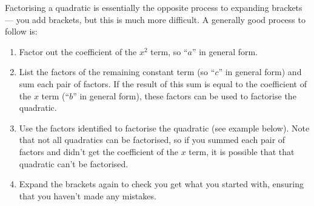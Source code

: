 \documentclass[12pt]{article}
\begin{document}
Factorising a quadratic is essentially the opposite process to expanding brackets --- you add brackets, but this is much more difficult. A generally good process to follow is: 
\begin{enumerate}
  \item Factor out the coefficient of the $x^2$ term, so ``$a$'' in general form.
  \item List the factors of the remaining constant term (so ``$c$'' in general form) and sum each pair of factors. If the result of this sum is equal to the coefficient of the $x$ term (``$b$'' in general form), these factors can be used to factorise the quadratic.
  \item Use the factors identified to factorise the quadratic (see example below). Note that not all quadratics can be factorised, so if you summed each pair of factors and didn't get the coefficient of the $x$ term, it is possible that that quadratic can't be factorised.
  \item Expand the brackets again to check you get what you started with, ensuring that you haven't made any mistakes.
\end{enumerate}
\end{document}
